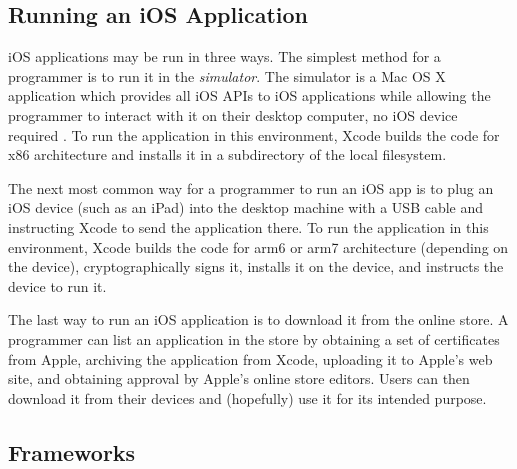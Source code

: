 \subsection{Running an iOS Application}

iOS applications may be run in three ways. The simplest method for a programmer
is to run it in the \emph{simulator}. The simulator is a Mac OS X application
which provides all iOS APIs to iOS applications while allowing the programmer to
interact with it on their desktop computer, no iOS device required
\cite{ios:application-programming-guide}. To run the application in this
environment, Xcode builds the code for x86 architecture and installs it in a
subdirectory of the local filesystem.

The next most common way for a programmer to run an iOS app is to plug an iOS
device (such as an iPad) into the desktop machine with a USB cable and
instructing Xcode to send the application there. To run the application in this
environment, Xcode builds the code for arm6 or arm7 architecture (depending on
the device), cryptographically signs it, installs it on the device, and
instructs the device to run it.

The last way to run an iOS application is to download it from the online store.
A programmer can list an application in the store by obtaining a set of
certificates from Apple, archiving the application from Xcode, uploading it to
Apple's web site, and obtaining approval by Apple's online store editors. Users
can then download it from their devices and (hopefully) use it for its intended
purpose.

\subsection{Frameworks}
